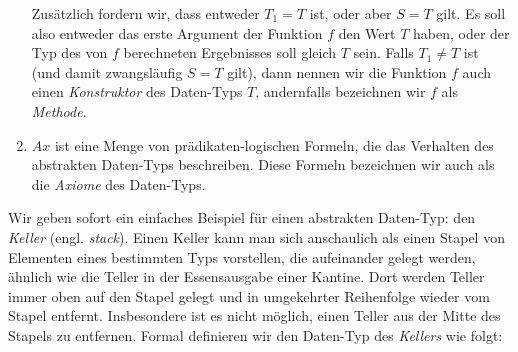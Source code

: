 \begin{enumerate}
      Zus\"atzlich fordern wir, dass entweder $T_1 = T$ ist, oder aber $S = T$
      gilt.  Es soll also entweder das erste Argument der Funktion $f$ den Wert
      $T$ haben, oder der Typ des von $f$ berechneten Ergebnisses soll gleich
      $T$ sein. Falls $T_1 \not= T$ ist (und damit zwangsl\"aufig $S = T$ gilt),
      dann nennen wir die Funktion $f$ auch einen \emph{Konstruktor} des
      Daten-Typs $T$, andernfalls bezeichnen wir $f$ als \emph{Methode}.
\item $Ax$ ist eine Menge von pr\"adikaten-logischen Formeln, die das Verhalten 
      des abstrakten Daten-Typs beschreiben.  Diese Formeln bezeichnen wir auch
      als die \emph{Axiome} des Daten-Typs.
\end{enumerate}
Wir geben sofort ein einfaches Beispiel f\"ur einen abstrakten Daten-Typ: den
\emph{Keller} (engl. \emph{stack}).  Einen Keller kann man sich anschaulich als
einen Stapel von  Elementen eines bestimmten Typs vorstellen, die aufeinander
gelegt werden, \"ahnlich wie die Teller in der Essensausgabe einer Kantine.  Dort
werden Teller immer oben auf den Stapel gelegt und in umgekehrter Reihenfolge
wieder vom Stapel entfernt.  Insbesondere ist es nicht m\"oglich, einen Teller aus
der Mitte des Stapels zu entfernen.
Formal definieren wir den Daten-Typ des \emph{Kellers}
wie folgt:
